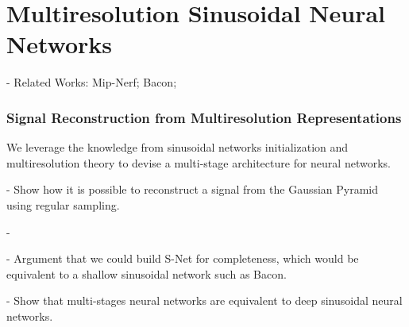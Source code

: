 \chapter{Multiresolution Sinusoidal Neural Networks}

- Related Works: Mip-Nerf; Bacon; 

\subsection{Signal Reconstruction from Multiresolution Representations }

We leverage the knowledge from sinusoidal networks initialization and multiresolution theory to devise a multi-stage architecture for neural networks. 

- Show how it is possible to reconstruct a signal from the Gaussian Pyramid using regular sampling.

- 

- Argument that we could build S-Net for completeness, which would be equivalent to a shallow sinusoidal network such as Bacon.

- Show that multi-stages neural networks are equivalent to deep sinusoidal neural networks.



